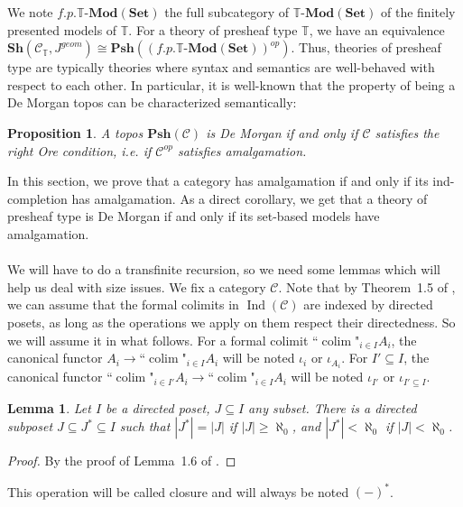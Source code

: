 \documentclass{article}
\newtheorem{Lemma}[theorem]{Lemma}
\newtheorem{proposition}[theorem]{Proposition}
\newcommand{\T}{\mathbb{T}}
\newcommand{\fcolim}{\text{``}\colim\text{"}}
\newcommand{\Ind}{\operatorname{Ind}}
\newcommand{\colim}{\operatorname{colim}}
\newcommand{\Set}{\mathbf{Set}}
\newcommand{\Mod}{{\mathbf{Mod}}}
\begin{document}
We note $f.p.\T\text{-}\Mod(\Set)$ the full subcategory of $\T\text{-}\Mod(\Set)$ of the finitely presented models of $\T$. For a theory of presheaf type $\T$, we have an equivalence $\mathbf{Sh}(\mathcal{C}_\T,J^{geom})\cong \mathbf{Psh}((f.p.\T\text{-}\Mod(\Set))^{op})$. Thus, theories of presheaf type are typically theories where syntax and semantics are well-behaved with respect to each other. In particular, it is well-known that the property of being a De Morgan topos can be characterized semantically: 

 \begin{proposition}\label{Ore}
     A topos $\mathbf{Psh}(\mathcal{C})$ is De Morgan if and only if $\mathcal{C}$ satisfies the right Ore condition, i.e. if $\mathcal{C}^{op}$ satisfies amalgamation.
 \end{proposition}
 
In this section, we prove that a category has amalgamation if and only if its ind-completion has amalgamation. As a direct corollary, we get that a theory of presheaf type is De Morgan if and only if its set-based models have amalgamation.\\
\\
We will have to do a transfinite recursion, so we need some lemmas which will help us deal with size issues. We fix a category $\mathcal{C}$. Note that by Theorem~1.5 of \cite{rosicky1994locally}, we can assume that the formal colimits in $\Ind(\mathcal{C})$ are indexed by directed posets, as long as the operations we apply on them respect their directedness. So we will assume it in what follows. For a formal colimit $\fcolim_{i\in I}A_i$, the canonical functor $A_i\xrightarrow{}\fcolim_{i\in I}A_i$ will be noted $\iota_i$ or $\iota_{A_i}$. For $I'\subseteq I$, the canonical functor $\fcolim_{i\in I'}A_i\xrightarrow{}\fcolim_{i\in I}A_i$ will be noted $\iota_{I'}$ or $\iota_{I'\subseteq I}$.

\begin{Lemma}
    Let $I$ be a directed poset, $J\subseteq I$ any subset. There is a directed subposet $J\subseteq J^*\subseteq I$ such that $|J^*|=|J|$ if $|J|\geq\aleph_0$, and $|J^*|<\aleph_0$ if $|J|<\aleph_0$.
\end{Lemma}
\begin{proof}
    By the proof of Lemma~1.6 of \cite{rosicky1994locally}.
\end{proof}

This operation will be called closure and will always be noted $(-)^*$.
\end{document}
